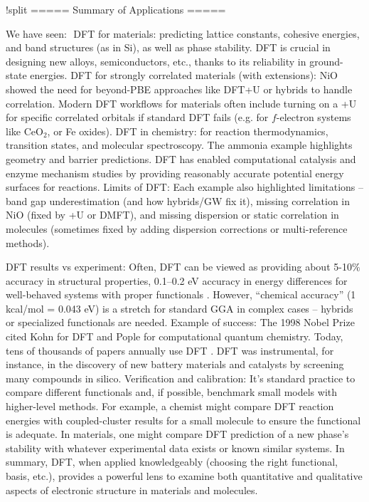!split
===== Summary of Applications =====

We have seen:  DFT for materials: predicting lattice constants,
cohesive energies, and band structures (as in Si), as well as phase
stability. DFT is crucial in designing new alloys, semiconductors,
etc., thanks to its reliability in ground-state energies.  DFT for
strongly correlated materials (with extensions): NiO showed the need
for beyond-PBE approaches like DFT+U or hybrids to handle
correlation. Modern DFT workflows for materials often include turning
on a +U for specific correlated orbitals if standard DFT fails
(e.g. for $f$-electron systems like CeO$_2$, or Fe oxides).  DFT in
chemistry: for reaction thermodynamics, transition states, and
molecular spectroscopy. The ammonia example highlights geometry and
barrier predictions. DFT has enabled computational catalysis and
enzyme mechanism studies by providing reasonably accurate potential
energy surfaces for reactions.  Limits of DFT: Each example also
highlighted limitations – band gap underestimation (and how hybrids/GW
fix it), missing correlation in NiO (fixed by +U or DMFT), and missing
dispersion or static correlation in molecules (sometimes fixed by
adding dispersion corrections or multi-reference methods).

DFT results vs experiment: Often, DFT can be viewed as providing about
5-10$\%$ accuracy in structural properties, 0.1–0.2 eV accuracy in
energy differences for well-behaved systems with proper functionals
. However, “chemical accuracy” (1 kcal/mol = 0.043 eV) is a stretch
for standard GGA in complex cases – hybrids or specialized functionals
are needed.  Example of success: The 1998 Nobel Prize cited Kohn for
DFT and Pople for computational quantum chemistry. Today, tens of
thousands of papers annually use DFT . DFT was instrumental, for
instance, in the discovery of new battery materials and catalysts by
screening many compounds in silico.  Verification and calibration:
It’s standard practice to compare different functionals and, if
possible, benchmark small models with higher-level methods. For
example, a chemist might compare DFT reaction energies with
coupled-cluster results for a small molecule to ensure the functional
is adequate. In materials, one might compare DFT prediction of a new
phase’s stability with whatever experimental data exists or known
similar systems.  In summary, DFT, when applied knowledgeably
(choosing the right functional, basis, etc.), provides a powerful lens
to examine both quantitative and qualitative aspects of electronic
structure in materials and molecules. 


